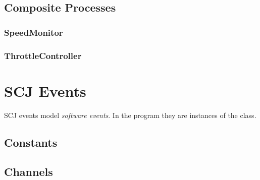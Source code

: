 \documentclass{article}
\begin{document}
\subsection{Composite Processes}

\subsubsection{SpeedMonitor}

\begin{circusbox}

\end{circusbox}

\subsubsection{ThrottleController}

\begin{circusbox}

\end{circusbox}

\newpage


\section{SCJ Events}

SCJ events model \emph{software events}. In the program they are instances of the  class.

\subsection{Constants}

\begin{circusbox}

\end{circusbox}
%
\begin{circusbox}

\end{circusbox}

\subsection{Channels}

\begin{circusbox}

\end{circusbox}
%
\begin{circusbox}

\end{circusbox}
\end{document}
